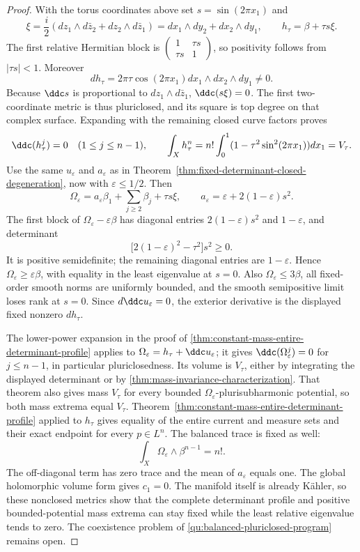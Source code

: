 \begin{proof}
With the torus coordinates above set $s=\sin(2\pi x_1)$ and
\[
 \xi=\frac i2(dz_1\wedge d\bar z_2+dz_2\wedge d\bar z_1)
      =dx_1\wedge dy_2+dx_2\wedge dy_1,
 \qquad h_\tau=\beta+\tau s\xi.
\]
The first relative Hermitian block is
$\left(\begin{smallmatrix}1&\tau s\\\tau s&1\end{smallmatrix}\right)$,
so positivity follows from $|\tau s|<1$. Moreover
\[
 dh_\tau=2\pi\tau\cos(2\pi x_1)
                   dx_1\wedge dx_2\wedge dy_1\ne0.
\]
Because $\ddc s$ is proportional to $dz_1\wedge d\bar z_1$,
$\ddc(s\xi)=0$. The first two-coordinate metric is thus pluriclosed,
and its square is top degree on that complex surface. Expanding with
the remaining closed curve factors proves
\[
 \ddc(h_\tau^j)=0\quad(1\leq j\leq n-1),\qquad
 \int_X h_\tau^n=n!\int_0^1(1-\tau^2\sin^2(2\pi x_1))dx_1
                   =V_\tau.
\]
Use the same $u_\varepsilon$ and $a_\varepsilon$ as in
Theorem~\ref{thm:fixed-determinant-closed-degeneration}, now with $\varepsilon\leq1/2$. Then
\[
 \Omega_\varepsilon=a_\varepsilon\beta_1+
       \sum_{j\geq2}\beta_j+\tau s\xi,
 \qquad a_\varepsilon=\varepsilon+2(1-\varepsilon)s^2.
\]
The first block of $\Omega_\varepsilon-\varepsilon\beta$ has
diagonal entries $2(1-\varepsilon)s^2$ and $1-\varepsilon$, and
determinant
\[
 \bigl[2(1-\varepsilon)^2-\tau^2\bigr]s^2\geq0.
\]
It is positive semidefinite; the remaining diagonal entries are
$1-\varepsilon$. Hence $\Omega_\varepsilon\geq\varepsilon\beta$,
with equality in the least eigenvalue at $s=0$.
Also $\Omega_\varepsilon\leq3\beta$, all fixed-order smooth norms
are uniformly bounded, and the smooth semipositive limit loses rank
at $s=0$. Since $d\ddc u_\varepsilon=0$, the exterior derivative
is the displayed fixed nonzero $dh_\tau$.

The lower-power expansion in the proof of \cref{thm:constant-mass-entire-determinant-profile} applies to $\Omega_\varepsilon=h_\tau+\ddc u_\varepsilon$; it gives $\ddc(\Omega_\varepsilon^j)=0$ for $j\leq n-1$, in particular pluriclosedness. Its volume is $V_\tau$, either by integrating the displayed determinant or by \cref{thm:mass-invariance-characterization}. That theorem also gives mass $V_\tau$ for every bounded $\Omega_\varepsilon$-plurisubharmonic potential, so both mass extrema equal $V_\tau$.
Theorem~\ref{thm:constant-mass-entire-determinant-profile} applied to $h_\tau$ gives equality of the
entire current and measure sets and their exact endpoint for every
$p\in L^n$. The balanced trace is fixed as well:
\[
 \int_X\Omega_\varepsilon\wedge\beta^{n-1}=n!.
\]
The off-diagonal term has zero trace and the mean of
$a_\varepsilon$ equals one. The global holomorphic volume form gives
$c_1=0$. The manifold itself is already K\"ahler, so these
nonclosed metrics show that the complete determinant profile and
positive bounded-potential mass extrema can stay fixed while the
least relative eigenvalue tends to zero. The coexistence problem
of \cref{qu:balanced-pluriclosed-program} remains open.
\end{proof}
